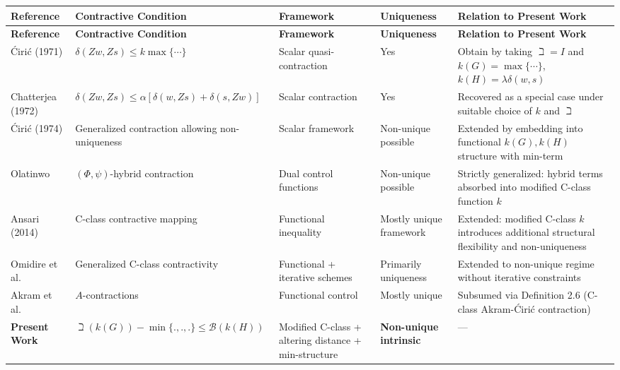 \documentclass[11pt,reqno]{amsart}
\theoremstyle{definition}
\theoremstyle{remark}
\numberwithin{equation}{section}
\begin{document}
\begin{center}
	\begin{longtable}{p{2cm} p{3.5cm} p{2.1cm} p{2.2cm} p{2.3cm}}
		\toprule
		\textbf{Reference} & \textbf{Contractive Condition} & \textbf{Framework} & \textbf{Uniqueness} & \textbf{Relation to Present Work} \\
		\midrule
		\endfirsthead
		
		\toprule
		\textbf{Reference} & \textbf{Contractive Condition} & \textbf{Framework} & \textbf{Uniqueness} & \textbf{Relation to Present Work} \\
		\midrule
		\endhead
		Ćirić (1971) 
		& $\delta(Zw,Zs) \leq k \max\{\cdots\}$ 
		& Scalar quasi-contraction 
		& Yes 
		& Obtain by taking $\beth=I$ and $k(G)=\max\{\cdots\}$, $k(H)=\lambda \delta(w,s)$ \\
		
		\addlinespace
		Chatterjea (1972) 
		& $\delta(Zw,Zs) \leq \alpha [\delta(w,Zs) + \delta(s,Zw)]$ 
		& Scalar contraction 
		& Yes 
		& Recovered as a special case under suitable choice of $k$ and $\beth$ \\
		
		\addlinespace
		
		Ćirić (1974) 
		& Generalized contraction allowing non-uniqueness 
		& Scalar framework 
		& Non-unique possible 
		& Extended by embedding into functional $k(G),k(H)$ structure with min-term \\
		
		\addlinespace
		
		Olatinwo 
		& $(\Phi,\psi)$-hybrid contraction 
		& Dual control functions 
		& Non-unique possible 
		& Strictly generalized: hybrid terms absorbed into modified C-class function $k$ \\
		
		\addlinespace
		
		Ansari (2014) 
		& C-class contractive mapping 
		& Functional inequality 
		& Mostly unique framework 
		& Extended: modified C-class $k$ introduces additional structural flexibility and non-uniqueness \\
		
		\addlinespace
		
		Omidire et al. 
		& Generalized C-class contractivity 
		& Functional + iterative schemes 
		& Primarily uniqueness
		& Extended to non-unique regime without iterative constraints \\
		
		\addlinespace
		
		Akram et al. 
		& $A$-contractions 
		& Functional control 
		& Mostly unique 
		& Subsumed via Definition 2.6 (C-class Akram-Ćirić contraction) \\
		
		\addlinespace
		
		\textbf{Present Work} 
		& $ \beth(k(G)) - \min\{.,.,.\} \leq \mathcal{B}(k(H)) $ 
		& Modified C-class + altering distance + min-structure 
		& \textbf{Non-unique intrinsic} 
		& --- \\
		
		\bottomrule
	\end{longtable}
\end{center}
\end{document}
